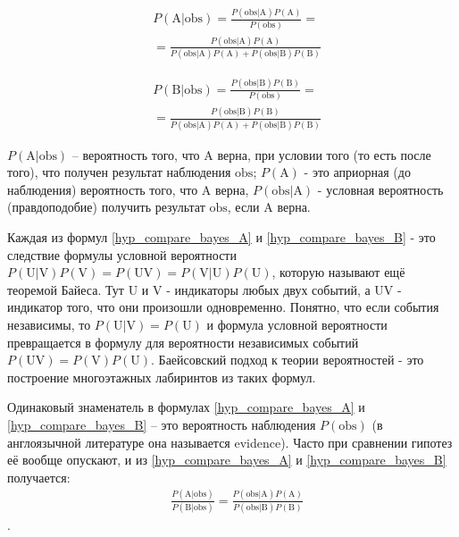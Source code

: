 \documentclass{book}
\begin{document}
\begin{align}\label{hyp_compare_bayes_A}
   &P\left(\text{A|obs}\right)=
   \frac{P\left(\text{obs|A}\right) P\left(\text{A}\right)}{P\left(\text{obs}\right)} = \nonumber \\
   &=\frac{P\left(\text{obs|A}\right) P\left(\text{A}\right)}{P\left(\text{obs|A}\right) P\left(\text{A}\right)+P\left(\text{obs|B}\right) P\left(\text{B}\right)} 
\end{align}

\begin{align}\label{hyp_compare_bayes_B}
   &P\left(\text{B|obs}\right)=
   \frac{P\left(\text{obs|B}\right) P\left(\text{B}\right)}{P\left(\text{obs}\right)} = \nonumber \\
   &=\frac{P\left(\text{obs|B}\right) P\left(\text{B}\right)}{P\left(\text{obs|A}\right) P\left(\text{A}\right)+P\left(\text{obs|B}\right) P\left(\text{B}\right)}
\end{align}


$P\left(\text{A|obs}\right)$ -- вероятность того, что $\text{A}$ верна, при условии того (то есть после того), что получен результат наблюдения $\text{obs}$; $P\left(\text{A}\right)$ - это априорная (до наблюдения) вероятность того, что $\text{A}$ верна, $P\left(\text{obs|A}\right)$ - условная вероятность (правдоподобие) получить результат $\text{obs}$, если $\text{A}$ верна. 

Каждая из формул \eqref{hyp_compare_bayes_A} и \eqref{hyp_compare_bayes_B} - это следствие формулы условной вероятности
$\label{bayes}
P\left(\text{U|V}\right)P\left(\text{V}\right)=P\left(\text{UV}\right)=P\left(\text{V|U}\right)P\left(\text{U}\right)
$, которую называют ещё теоремой Байеса. Тут U и V - индикаторы любых двух событий, а UV - индикатор того, что они произошли одновременно. Понятно, что если события независимы, то $P\left(\text{U|V}\right)=P\left(\text{U}\right)$ и формула условной вероятности превращается в формулу для вероятности независимых событий $P\left(\text{UV}\right)=P\left(\text{V}\right)P\left(\text{U}\right)$. Баейсовский подход к теории вероятностей - это построение многоэтажных лабиринтов из таких формул.

Одинаковый знаменатель в формулах \eqref{hyp_compare_bayes_A} и \eqref{hyp_compare_bayes_B} -- это вероятность наблюдения $P\left(\text{obs}\right)$ (в англоязычной литературе она называется evidence). Часто при сравнении гипотез её вообще опускают, и из \eqref{hyp_compare_bayes_A} и \eqref{hyp_compare_bayes_B} получается:
\begin{align*}\label{hyp_compare_bayes_comp}
   &\frac{P\left(\text{A|obs}\right)}{P\left(\text{B|obs}\right)}=\frac{P\left(\text{obs|A}\right) P\left(\text{A}\right)}{P\left(\text{obs|B}\right) P\left(\text{B}\right)}
\end{align*}.
\end{document}
